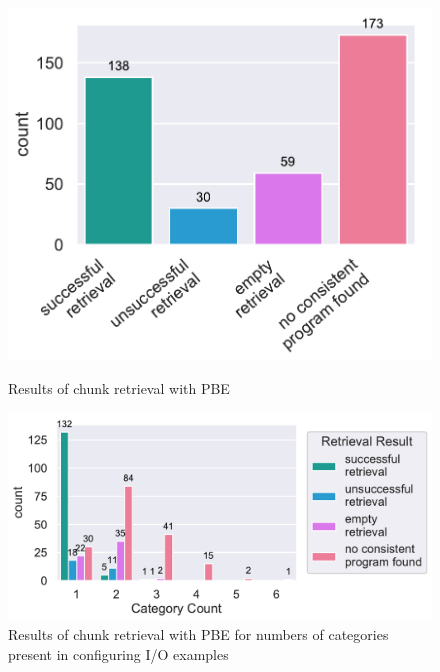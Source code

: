 \documentclass[\myrootdir/main.tex]{subfiles}
\begin{document}


\begin{figure}[htbp]
	\centering
	\begin{minipage}{0.45\textwidth}
		\centering
		\includegraphics[width=\textwidth, clip]{img/big-study/failure-reason-PBE.pdf}
		\caption{Results of chunk retrieval with PBE}
		\label{fig:failure-reason-PBE}
	\end{minipage}\hfill
	\begin{minipage}{0.45\textwidth}
		\centering
		\includegraphics[width=\textwidth, clip]{img/big-study/failure-reason-categorycount-PBE.pdf}
		\caption{Results of chunk retrieval with PBE for numbers of categories present in configuring I/O examples}
		\label{fig:failure-reason-categorycount-PBE}
	\end{minipage}
\end{figure}
\end{document}
